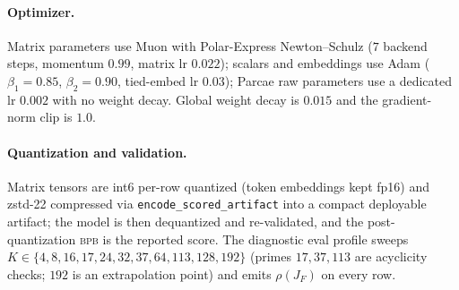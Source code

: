 \documentclass[11pt]{article}
\newcommand{\rhoF}{\rho(J_F)}
\newcommand{\bpb}{\textsc{bpb}}
\newcommand{\code}[1]{\texttt{#1}}
\begin{document}
\paragraph{Optimizer.} Matrix parameters use Muon with Polar-Express Newton--Schulz
($7$ backend steps, momentum $0.99$, matrix lr $0.022$); scalars and embeddings use Adam
($\beta_1{=}0.85$, $\beta_2{=}0.90$, tied-embed lr $0.03$); Parcae raw parameters use a dedicated
lr $0.002$ with no weight decay.  Global weight decay is $0.015$ and the gradient-norm clip is
$1.0$.

\paragraph{Quantization and validation.} Matrix tensors are int6 per-row quantized (token
embeddings kept fp16) and zstd-22 compressed via \code{encode\_scored\_artifact} into a compact
deployable artifact; the model is then dequantized and re-validated, and the post-quantization
\bpb{} is the reported score.  The diagnostic eval profile
sweeps $K\in\{4,8,16,17,24,\allowbreak 32,37,64,113,128,192\}$ (primes $17,37,113$ are acyclicity
checks; $192$ is an extrapolation point) and emits $\rhoF$ on every row.
\end{document}
